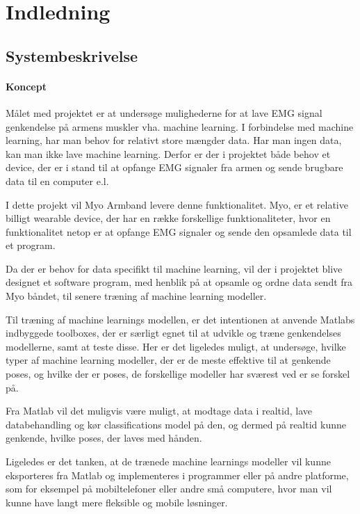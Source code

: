 \thispagestyle{fancy}
\chapter{Indledning}
\label{chp:indledning}

\section{Systembeskrivelse}

\subsubsection{Koncept}
Målet med projektet er at undersøge mulighederne for at lave EMG signal genkendelse på armens muskler vha. machine learning.
I forbindelse med machine learning, har man behov for relativt store mængder data. Har man ingen data, kan man ikke lave machine learning. Derfor er der i projektet både behov et device, der er i stand til at opfange EMG signaler fra armen og sende brugbare data til en computer e.l.
 
I dette projekt vil Myo Armband levere denne funktionalitet. Myo, er et relative billigt wearable device, der har en række forskellige funktionaliteter, hvor en funktionalitet netop er at opfange EMG signaler og sende den opsamlede data til et program.

Da der er behov for data specifikt til machine learning, vil der i projektet blive designet et software program, med henblik på at opsamle og ordne data sendt fra Myo båndet, til senere træning af machine learning modeller.

Til træning af machine learnings modellen, er det intentionen at anvende Matlabs indbyggede toolboxes, der er særligt egnet til at udvikle og træne genkendelses modellerne, samt at teste disse. 
Her er det ligeledes muligt, at undersøge, hvilke typer af machine learning modeller, der er de meste effektive til at genkende poses, og hvilke der er poses, de forskellige modeller har sværest ved er se forskel på. 

Fra Matlab vil det muligvis være muligt, at modtage data i realtid, lave databehandling og kør classifications model på den, og dermed på realtid kunne genkende, hvilke poses, der laves med hånden.

Ligeledes er det tanken, at de trænede machine learnings modeller vil kunne eksporteres fra Matlab og implementeres i programmer eller på andre platforme, som for eksempel på mobiltelefoner eller andre små computere, hvor man vil kunne have langt mere fleksible og mobile løsninger.

